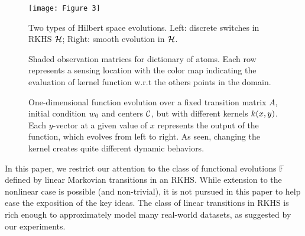 \begin{figure}
	\centering
	\begin{minipage}{0.45\textwidth}
	\centering
	\texttt{[image: Figure 3]}
	\caption{\small{Two types of Hilbert space evolutions. Left: discrete switches in RKHS $\mathcal{H}$; Right: smooth evolution in $\mathcal{H}$.}}
	\label{fig:hilbert_evolution}           
	\end{minipage}\hfill

	\begin{minipage}{0.45\textwidth}
	\centering
	\caption{\small{Shaded observation matrices for dictionary of atoms. Each row represents a sensing location with the color map indicating the evaluation of kernel function w.r.t the others points in the domain.}}
	\label{fig:shaded}
	\end{minipage}
\end{figure}


\begin{figure}[t]
\centering
{}
\caption{\small{One-dimensional function evolution over a fixed transition matrix $A$, 
initial condition $w_0$ and centers $\mathcal{C}$, but with different kernels $k(x,y)$. 
Each $y$-vector at a given value of $x$ represents the output of the function, which evolves from left to right. 
As seen, changing the kernel creates quite different dynamic behaviors. }%
}
\label{fig:kernel_variation}
\end{figure}


In this paper, we restrict our attention to the class of functional evolutions $\mathbb{F}$ defined by linear Markovian transitions in an RKHS. While extension to the nonlinear case is possible (and non-trivial), it is not pursued in this paper to help ease the exposition of the key ideas. The class of linear transitions in RKHS is rich enough to approximately model many real-world datasets, as suggested by our experiments.

